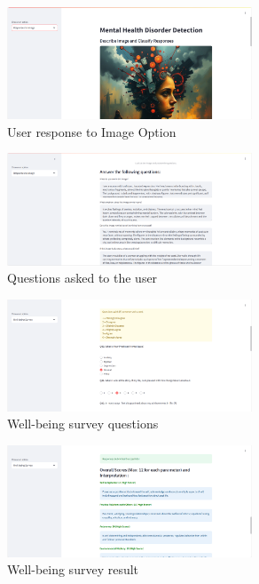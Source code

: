 \pagebreak

\begin{figure}[h!]  
    \centering
    \includegraphics[width=0.65\textwidth]{App Images/26 Interface.png}  
    \caption{User response to Image Option} 
    \label{10i23445}  %
\end{figure} 

\begin{figure}[h!]  
    \centering
    \includegraphics[width=0.65\textwidth]{App Images/27 Interface.png}  
    \caption{Questions asked to the user}
    \label{10i23445}  %
\end{figure} 


\begin{figure}[h!]  
    \centering
    \includegraphics[width=0.65\textwidth]{App Images/29 Interface.png}  
    \caption{Well-being survey questions}
    \label{10i23445}  %
\end{figure} 

\begin{figure}[h!]  
    \centering
    \includegraphics[width=0.65\textwidth]{App Images/30 Interface.png}  
    \caption{Well-being survey result}
    \label{10i23445}  %
\end{figure} 

